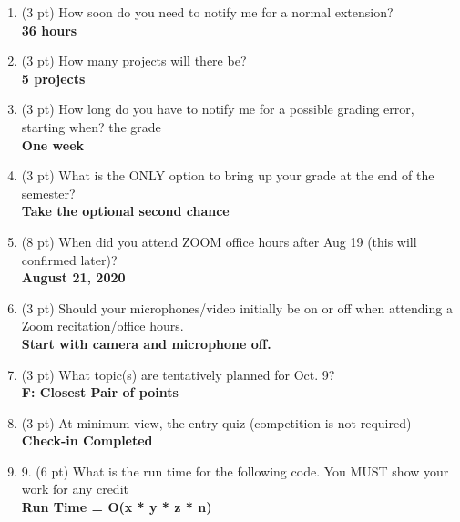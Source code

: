 \documentclass[12pt]{article}
\begin{document}
\begin{enumerate}

  \item (3 pt) How soon do you need to notify me for a normal extension? \\
    \textbf{36 hours}

  \item (3 pt) How many projects will there be? \\
    \textbf{5 projects}

  \item (3 pt) How long do you have to notify me for a possible grading error, starting when? the grade \\
    \textbf{One week}

  \item (3 pt) What is the ONLY option to bring up your grade at the end of the semester? \\
    \textbf{Take the optional second chance }

  \item (8 pt) When did you attend ZOOM office hours after Aug 19 (this will confirmed later)? \\
    \textbf{August 21, 2020  }

  \item (3 pt) Should your microphones/video initially be on or off when attending a Zoom recitation/office hours. \\
    \textbf{Start with camera and microphone off.}

  \item (3 pt) What topic(s) are tentatively planned for Oct. 9? \\
    \textbf{F: Closest Pair of points}

  \item (3 pt) At minimum view, the entry quiz (competition is not required) \\
    \textbf{Check-in Completed}

  \item 9. (6 pt) What is the run time for the following code. You MUST show your work for any credit \\ 
    \textbf{Run Time = O(x * y * z * n)}

\end{enumerate}
\end{document}
